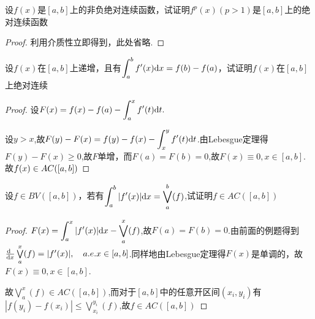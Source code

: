 设$f(x)$是$[a,b]$上的非负绝对连续函数，试证明$f^p(x)(p>1)$是$[a,b]$上的绝对连续函数
\begin{proof}
	利用介质性立即得到，此处省略.
\end{proof}


设$f(x)$在$[a,b]$上递增，且有$\displaystyle{\int_{a}^{b}f'(x)\mathrm{d}x}=f(b)-f(a)$，试证明$f(x)$在$[a,b]$上绝对连续
\begin{proof}
	设$F(x)=f(x)-f(a)-\displaystyle{\int_{a}^{x}f'(t)\mathrm{d}t}.$ \par  设$y>x$,故$F(y)-F(x)=f(y)-f(x)-\displaystyle{\int_{x}^{y}f'(t)\mathrm{d}t}$.由Lebesgue定理得$F(y)-F(x)\geq0$,故$F$单增，而$F(a)=F(b)=0$,故$F(x)\equiv0,x\in[a,b]$.故$f(x)\in AC([a,b])\\$
\end{proof}


设$f\in BV([a,b])$，若有$\displaystyle{\int_{a}^{b}|f'(x)|\mathrm{d}x=\bigvee\limits_a^b(f)}$,试证明$f\in AC([a,b])$
\begin{proof}
	$F(x)=\displaystyle{\int_{a}^{x}|f'(x)|\mathrm{d}x-\bigvee\limits_a^x(f)}$,故$F(a)=F(b)=0$.由前面的例题得到$\frac{\mathrm{d}\ }{\mathrm{d}x}\bigvee\limits_a^x(f)=|f'(x)|,\quad a.e.x\in[a,b]$.同样地由Lebesgue定理得$F(x)$是单调的，故$F(x)\equiv0,x\in[a,b]$.\par 故$\displaystyle{\bigvee\limits_a^x(f)\in AC([a,b])}$,而对于$[a,b]$中的任意开区间$(x_i,y_i)$有$\displaystyle{|f(y_i)-f(x_i)|\leq \bigvee\limits_{x_i}^{y_i}(f)}$,故$f\in AC([a,b])$
\end{proof}